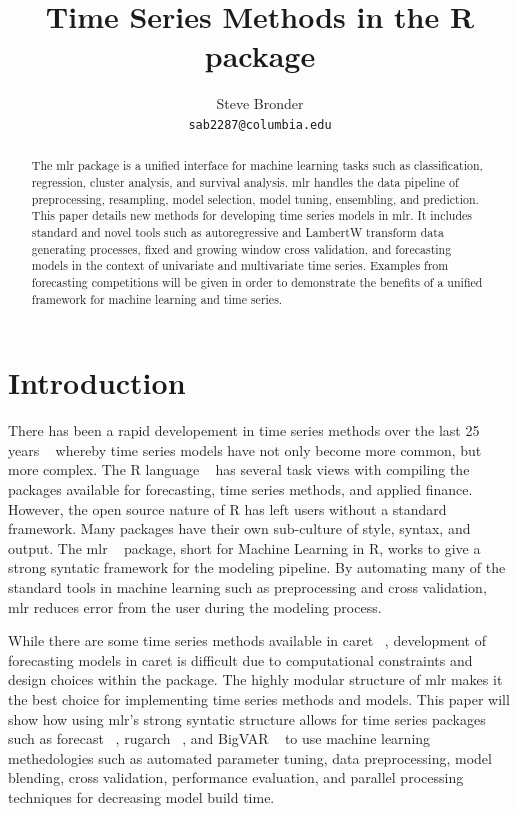 \documentclass[12pt]{article}\usepackage[]{graphicx}\usepackage[]{color}
\title{Time Series Methods in the R package \pkg{mlr}}
\author{
  Steve Bronder \\
  \texttt{sab2287@columbia.edu} \\
}
\theoremstyle{definition}
\let\proglang=\textsf
\newcommand{\pkg}[1]{{\fontseries{b}\selectfont #1}}
\begin{document}

\maketitle

\begin{abstract}
The \pkg{mlr} package is a unified interface for machine learning tasks such as classification, regression, cluster analysis, and survival analysis. \pkg{mlr} handles the data pipeline of preprocessing, resampling, model selection, model tuning, ensembling, and prediction. This paper details new methods for developing time series  models in \pkg{mlr}. It includes standard and novel tools such as autoregressive and LambertW transform data generating processes, fixed and growing window cross validation, and forecasting models in the context of univariate and multivariate time series. Examples from forecasting competitions will be given in order to demonstrate the benefits of a unified framework for machine learning and time series.
  \end{abstract}


\section{Introduction}
There has been a rapid developement in time series methods over the last 25 years ~\cite{Hyndman25} whereby time series models have not only become more common, but more complex. The \proglang{R} language ~\cite{Rbase} has several task views with compiling the packages available for forecasting, time series methods, and applied finance. However, the open source nature of R has left users without a standard framework. Many packages have their own sub-culture of style, syntax, and output. The \pkg{mlr} ~\cite{mlr} package, short for Machine Learning in R, works to give a strong syntatic framework for the modeling pipeline. By automating many of the standard tools in machine learning such as preprocessing and cross validation, \pkg{mlr} reduces error from the user during the modeling process. 

While there are some time series methods available in \pkg{caret} ~\cite{caret}, development of forecasting models in \pkg{caret} is difficult due to computational constraints and design choices within the package. The highly modular structure of \pkg{mlr} makes it the best choice for implementing time series methods and models. This paper will show how using \pkg{mlr}'s strong syntatic structure allows for time series packages such as \pkg{forecast} ~\cite{HyndForecast}, \pkg{rugarch} ~\cite{rugarch}, and \pkg{BigVAR} ~\cite{BigVAR} to use machine learning methedologies such as automated parameter tuning, data preprocessing, model blending, cross validation, performance evaluation, and parallel processing techniques for decreasing model build time.
\end{document}
